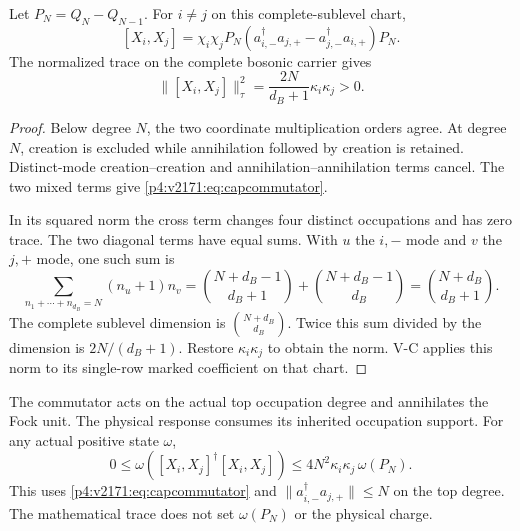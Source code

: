\documentclass[12pt,a4paper]{article}
\begin{document}
\begin{theorem}
\label{p4:v2171:thm:capcommutator}
Let $P_N=Q_N-Q_{N-1}$. For $i\ne j$ on this complete-sublevel chart,
\begin{equation}
 \boxed{[X_i,X_j]=\chi_i\chi_jP_N
 (a_{i,-}^\dagger a_{j,+}-a_{j,-}^\dagger a_{i,+})P_N.}
 \label{p4:v2171:eq:capcommutator}
\end{equation}
The normalized trace on the complete bosonic carrier gives
\begin{equation}
 \boxed{\|[X_i,X_j]\|_\tau^2
 =\frac{2N}{d_B+1}\kappa_i\kappa_j>0.}
 \label{p4:v2171:eq:capcommutatornorm}
\end{equation}
\end{theorem}
\begin{proof}
Below degree $N$, the two coordinate multiplication orders agree. At degree
$N$, creation is excluded while annihilation followed by creation is retained.
Distinct-mode creation--creation and annihilation--annihilation terms cancel.
The two mixed terms give \eqref{p4:v2171:eq:capcommutator}.

In its squared norm the cross term changes four distinct occupations and
has zero trace. The two diagonal terms have equal sums. With $u$ the $i,-$
mode and $v$ the $j,+$ mode, one such sum is
\[
 \sum_{n_1+\cdots+n_{d_B}=N}(n_u+1)n_v
 =\binom{N+d_B-1}{d_B+1}+\binom{N+d_B-1}{d_B}
 =\binom{N+d_B}{d_B+1}.
\]
The complete sublevel dimension is $\binom{N+d_B}{d_B}$. Twice this sum
divided by the dimension is $2N/(d_B+1)$. Restore $\kappa_i\kappa_j$ to obtain the norm.
V-C applies this norm to its single-row marked coefficient on that chart.
\end{proof}
The commutator acts on the actual top occupation degree and annihilates the
Fock unit. The physical response consumes its inherited occupation support.
For any actual positive state $\omega$,
\[
 0\le\omega([X_i,X_j]^\dagger[X_i,X_j])
 \le4N^2\kappa_i\kappa_j\,\omega(P_N).
\]
This uses \eqref{p4:v2171:eq:capcommutator} and
$\|a_{i,-}^\dagger a_{j,+}\|\le N$ on the top degree.
The mathematical trace does not set $\omega(P_N)$ or the physical charge.

\end{document}
